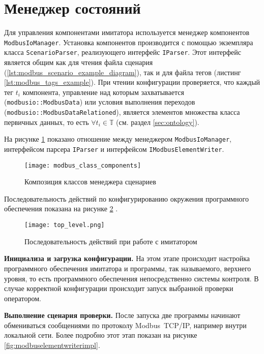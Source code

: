 \section{Менеджер состояний}
Для управления компонентами имитатора используется менеджер компонентов \texttt{ModbusIoManager}.
Установка компонентов производится с помощью экземпляра класса \texttt{ScenarioParser}, реализующего интерфейс \texttt{IParser}.
Этот интерфейс является общим как для чтения файла сценария (\ref{lst:modbus_scenario_example_diagram}),
так и для файла тегов (листинг \ref{lst:modbus_tags_example}).
При чтении конфигурации проверяется, что каждый тег $t_i$ компонента,
управление над которым захватывается (\texttt{modbusio::ModbusData})
или условия выполнения переходов (\texttt{modbusio::ModbusDataRelationed}),
является элементов множества класса первичных данных, то есть $\forall t_i \in \mathbb{T}$ (см. раздел \ref{sec:ontology}).

На рисунке \ref{fig:modbus_class_components} показано отношение между менеджером \texttt{ModbusIoManager},
интерфейсом парсера \texttt{IParser} и интерфейсом \texttt{IModbusElementWriter}.
\begin{center}
    \begin{figure}[hb!]
        \texttt{[image: modbus\_class\_components]}
        \caption{Композиция классов менеджера сценариев}\label{fig:modbus_class_components}
    \end{figure}
\end{center}


Последовательность действий по конфигурированию окружения программного обеспечения
показана на рисунке \ref{fig:top_level_sequence} \cite[стр. 239]{book:oop:oop_analize}.
\begin{center}
    \begin{figure}
        \texttt{[image: top\_level.png]}
        \caption{Последовательность действий при работе с имитатором}
        \label{fig:top_level_sequence}
    \end{figure}
\end{center}

\textbf{Инициализа и загрузка конфигурации.}
На этом этапе происходит настройка программного обеспечения
имитатора и программы, так называемого, верхнего уровня,
то есть программного обеспечения непосредственно системы контроля.
В случае корректной конфигурации происходит запуск
выбранной проверки оператором.

\textbf{Выполнение сценария проверки.}
После запуска две программы начинают обмениваться 
сообщениями по протоколу Modbus~TCP/IP, например внутри локальной сети.
Более подробно этот этап показан на рисунке \ref{fig:modbuselementwriterimpl}.

